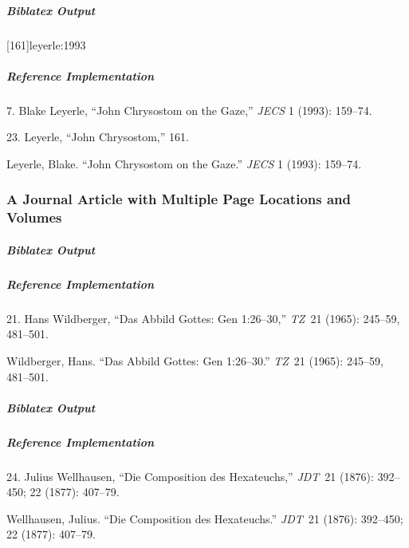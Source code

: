 \documentclass[a4paper]{article}
\newenvironment{biboutput}{%
  \subparagraph{Biblatex Output}
}{\color{black}}
\newenvironment{refimp}{%
  \subparagraph{Reference Implementation}
  \color{reference-colour}
  \rm
}{\par\color{black}}
\begin{document}
\begin{biboutput}
  [161]{leyerle:1993}
\end{biboutput}

\begin{refimp}
  \hspace*{\bibindent}7. Blake Leyerle, “John Chrysostom on the Gaze,”
  \emph{JECS} 1 (1993): 159–74.

  \hspace*{\bibindent}23. Leyerle, “John Chrysostom,” 161.

  \hangindent\bibindent Leyerle, Blake. “John Chrysostom on the Gaze.”
  \emph{JECS} 1 (1993): 159–74.

\end{refimp}

\subsubsection{A Journal Article with Multiple Page Locations and Volumes}

\begin{biboutput}
\end{biboutput}

\begin{refimp}
  \hspace*{\bibindent}21. Hans Wildberger, “Das Abbild Gottes: Gen 1:26–30,”
  \emph{TZ}~21 (1965): 245–59, 481–501.

  \hangindent\bibindent Wildberger, Hans. “Das Abbild Gottes: Gen 1:26–30.”
  \emph{TZ}~21 (1965): 245–59, 481–501.

\end{refimp}

\begin{biboutput}
\end{biboutput}

\begin{refimp}
  \hspace*{\bibindent}24. Julius Wellhausen, “Die Composition des Hexateuchs,”
  \emph{JDT}~21 (1876): 392–450; 22 (1877): 407–79.

  \hangindent\bibindent Wellhausen, Julius. “Die Composition des Hexateuchs.”
  \emph{JDT}~21 (1876): 392–450; 22 (1877): 407–79.

\end{refimp}
\end{document}
